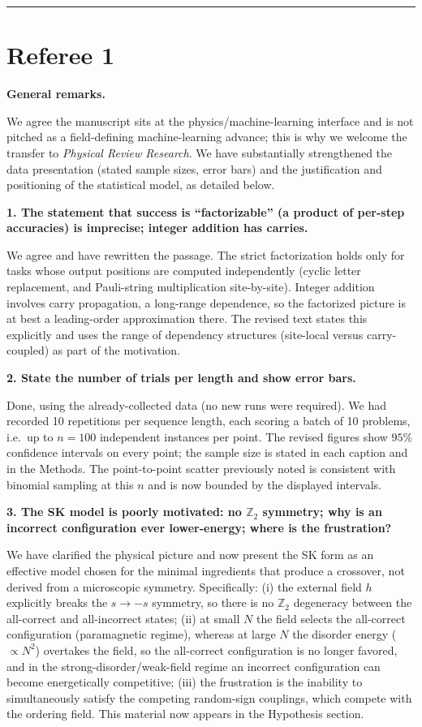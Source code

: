 \documentclass[11pt]{article}
\newcommand{\point}[1]{\medskip\noindent\textbf{#1}\par\nobreak}
\begin{document}
\bigskip\hrule\bigskip

\section{Referee 1}

\point{General remarks.}
We agree the manuscript sits at the physics/machine-learning interface and is not pitched as a
field-defining machine-learning advance; this is why we welcome the transfer to
\textit{Physical Review Research}. We have substantially strengthened the data presentation
(stated sample sizes, error bars) and the justification and positioning of the statistical
model, as detailed below.

\point{1. The statement that success is ``factorizable'' (a product of per-step accuracies) is
imprecise; integer addition has carries.}
We agree and have rewritten the passage. The strict factorization holds only for tasks whose
output positions are computed independently (cyclic letter replacement, and Pauli-string
multiplication site-by-site). Integer addition involves carry propagation, a long-range
dependence, so the factorized picture is at best a leading-order approximation there. The
revised text states this explicitly and uses the range of dependency structures (site-local
versus carry-coupled) as part of the motivation.

\point{2. State the number of trials per length and show error bars.}
Done, using the already-collected data (no new runs were required). We had recorded 10
repetitions per sequence length, each scoring a batch of 10 problems, i.e.\ up to $n=100$
independent instances per point. The revised figures show $95\%$ confidence intervals on every
point; the sample size is stated in each caption and in the Methods. The point-to-point scatter
previously noted is consistent with binomial sampling at this $n$ and is now bounded by the
displayed intervals.

\point{3. The SK model is poorly motivated: no $\mathbb{Z}_2$ symmetry; why is an incorrect
configuration ever lower-energy; where is the frustration?}
We have clarified the physical picture and now present the SK form as an effective model chosen
for the minimal ingredients that produce a crossover, not derived from a microscopic symmetry.
Specifically: (i) the external field $h$ explicitly breaks the $s\to-s$ symmetry, so there is no
$\mathbb{Z}_2$ degeneracy between the all-correct and all-incorrect states; (ii) at small $N$ the
field selects the all-correct configuration (paramagnetic regime), whereas at large $N$ the
disorder energy ($\propto N^2$) overtakes the field, so the all-correct configuration is no
longer favored, and in the strong-disorder/weak-field regime an incorrect configuration can
become energetically competitive; (iii) the frustration is the inability to simultaneously
satisfy the competing random-sign couplings, which compete with the ordering field. This
material now appears in the Hypothesis section.
\end{document}
